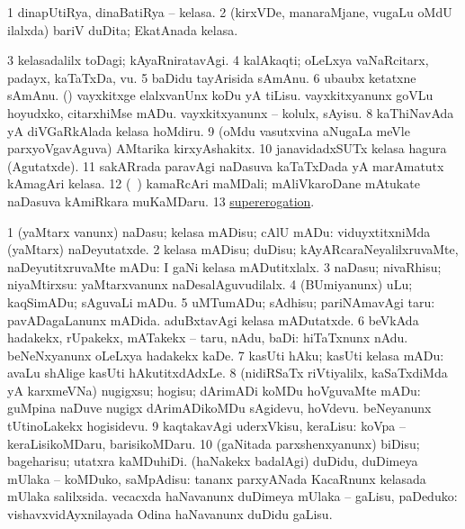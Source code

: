 \noindent
\gl{\pagu}
\expl{}
\bmng
\bnum
\num{1}  dinapUtiRya, dinaBatiRya -- kelasa. 
\num{2}  (kirxVDe, manaraMjane, \mo vugaLu oMdU ilalxda) bariV duDita; EkatAnada kelasa. 
\num{3}  kelasadalilx toDagi; kAyaRniratavAgi. 
\num{4}  kalAkaqti; oLeLxya vaNaRcitarx, padayx, kaTaTxDa, \mo vu. 
\num{5}  baDidu tayArisida sAmAnu. 
\num{6}  ubaubx ketatxne sAmAnu. 
  (\AmA) 
\banum
{} vayxkitxge elalxvanUnx koDu yA tiLisu. 
 vayxkitxyanunx goVLu hoyudxko, citarxhiMse mADu. 
 vayxkitxyanunx -- kolulx, sAyisu. 
\eanum
\numie
\num{8}  kaThiNavAda yA diVGaRkAlada kelasa hoMdiru. 
\num{9}  (oMdu vasutxvina aNugaLa meVle parxyoVgavAguva) AMtarika kirxyAshakitx. 
\num{10}  janavidadxSUTx kelasa hagura (Agutatxde). 
\num{11}  sakARrada paravAgi naDasuva kaTaTxDada yA marAmatutx kAmagAri kelasa. 
\num{12}  (\kanmu\ \birx) kamaRcAri maMDali; mAliVkaroDane mAtukate naDasuva kAmiRkara muKaMDaru. 
\num{13}  \hyperref{kandict_s.pdf}{S}{supererogation pagu}{supererogation}. 
\enum
\emng
\eentry

\bentry
{} 
\gl{\kirx}


\noindent
\gl{\sakirx}
\bmng
\bnum
\num{1} (yaMtarx \mo vanunx) naDasu; kelasa mADisu; cAlU mADu:  viduyxtitxniMda (yaMtarx) naDeyutatxde. 
\num{2} kelasa mADisu; duDisu; kAyARcaraNeyalilxruvaMte, naDeyutitxruvaMte mADu:  I gaNi kelasa mADutitxlalx. 
\num{3} naDasu; nivaRhisu; niyaMtirxsu:  yaMtarxvanunx naDesalAguvudilalx. 
\num{4} (BUmiyanunx) uLu; kaqSimADu; sAguvaLi mADu. 
\num{5} uMTumADu; sAdhisu; pariNAmavAgi taru:  pavADagaLanunx mADida.  aduBxtavAgi kelasa mADutatxde. 
\num{6} beVkAda hadakekx, rUpakekx, mATakekx -- taru, nAdu, baDi:  hiTaTxnunx nAdu.  beNeNxyanunx oLeLxya hadakekx kaDe. 
\num{7} kasUti hAku; kasUti kelasa mADu:  avaLu shAlige kasUti hAkutitxdAdxLe. 
\num{8} (nidiRSaTx riVtiyalilx, kaSaTxdiMda yA karxmeVNa) nugigxsu; hogisu; dArimADi koMDu hoVguvaMte mADu:  guMpina naDuve nugigx dArimADikoMDu sAgidevu, hoVdevu.  beNeyanunx tUtinoLakekx hogisidevu. 
\num{9} kaqtakavAgi uderxVkisu, keraLisu:  koVpa -- keraLisikoMDaru, barisikoMDaru. 
\num{10} (gaNitada parxshenxyanunx) biDisu; bageharisu; utatxra kaMDuhiDi. 
\banum
{} (haNakekx badalAgi) duDidu, duDimeya mUlaka -- koMDuko, saMpAdisu:   tananx parxyANada KacaRnunx kelasada mUlaka salilxsida. 
 vecacxda haNavanunx duDimeya mUlaka -- gaLisu, paDeduko:  vishavxvidAyxnilayada Odina haNavanunx duDidu gaLisu. 
\eanum
\numie
\enum
\emng

